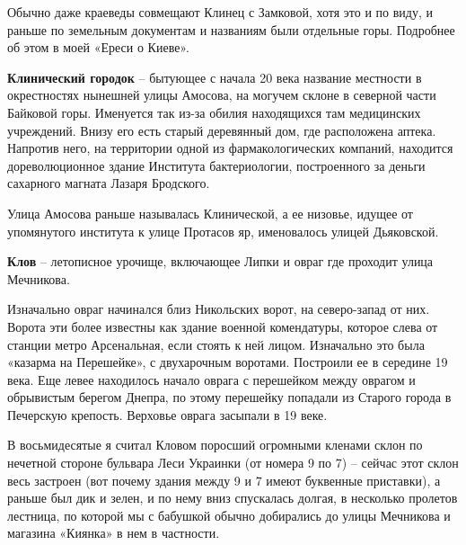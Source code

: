 Обычно даже краеведы совмещают Клинец с Замковой, хотя это и по виду, и раньше по земельным документам и названиям были отдельные горы. Подробнее об этом в моей «Ереси о Киеве».\\

\medskip


\textbf{Клинический городок} – бытующее с начала 20 века название местности в окрестностях нынешней улицы Амосова, на могучем склоне в северной части Байковой горы. Именуется так из-за обилия находящихся там медицинских учреждений. Внизу его есть старый деревянный дом, где расположена аптека. Напротив него, на территории одной из фармакологических компаний, находится дореволюционное здание Института бактериологии, построенного за деньги сахарного магната Лазаря Бродского.

Улица Амосова раньше называлась Клинической, а ее низовье, идущее от упомянутого института к улице Протасов яр, именовалось улицей Дьяковской.\\

\medskip

\textbf{Клов} – летописное урочище, включающее Липки и овраг где проходит улица Мечникова. 

Изначально овраг начинался близ Никольских ворот, на северо-запад от них. Ворота эти более известны как здание военной комендатуры, которое слева от станции метро Арсенальная, если стоять к ней лицом. Изначально это была «казарма на Перешейке», с двухарочным воротами. Построили ее в середине 19 века. Еще левее находилось начало оврага с перешейком между оврагом и обрывистым берегом Днепра, по этому перешейку попадали из Старого города в Печерскую крепость. Верховье оврага засыпали в 19 веке.


В восьмидесятые я считал Кловом поросший огромными кленами склон по нечетной стороне бульвара Леси Украинки (от номера 9 по 7) – сейчас этот склон весь застроен (вот почему здания между 9 и 7 имеют буквенные приставки), а раньше был дик и зелен, и по нему вниз спускалась долгая, в несколько пролетов лестница, по которой мы с бабушкой обычно добирались до улицы Мечникова и магазина «Киянка» в нем в частности.

